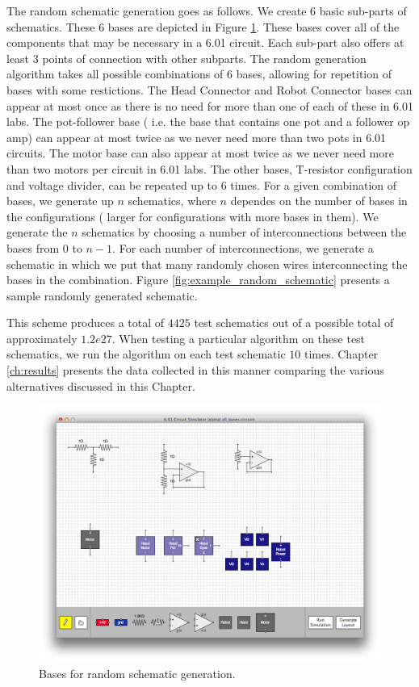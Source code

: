 The random schematic generation goes as follows. We create $6$ basic sub-parts
of schematics. These $6$ bases are depicted in Figure
\ref{fig:random_gen_bases}. These bases cover all of the components that may be
necessary in a 6.01 circuit. Each sub-part also offers at least $3$ points of
connection with other subparts. The random generation algorithm takes all
possible combinations of
$6$ bases, allowing for repetition of bases with some restictions.
The Head Connector and Robot Connector bases can appear at most once as there is
no need for more than one of each of these in 6.01 labs. The pot-follower base (
i.e. the base that contains one pot and a follower op amp) can appear at most
twice as we never need more than two pots in 6.01 circuits. The motor base can
also appear at most twice as we never need more than two motors per circuit in
6.01 labs. The other bases, T-resistor configuration and voltage divider, can be
repeated up to 6 times. For a given combination of bases, we generate up $n$
schematics, where $n$ dependes on the number of bases in the configurations (
larger for configurations with more bases in them).
We generate the $n$ schematics by choosing a number of interconnections between
the bases from $0$ to $n-1$. For each number of interconnections, we generate
a schematic in which we put that many randomly chosen wires interconnecting
the bases in the combination. Figure \ref{fig:example_random_schematic} presents
a sample randomly generated schematic.

This scheme produces a total of $4425$ test schematics out of a possible total
of approximately $1.2e27$. When testing a particular algorithm on these test
schematics, we run the algorithm on each test schematic $10$ times. Chapter
\ref{ch:results} presents the data collected in this manner comparing the
various alternatives discussed in this Chapter.

\begin{figure}
\begin{center}
\includegraphics[width=\textwidth]{Images/auto_generation_bases.png}
\caption{Bases for random schematic generation.}
\label{fig:random_gen_bases}
\end{center}
\end{figure}

